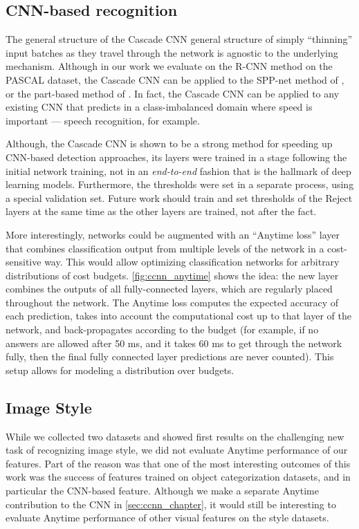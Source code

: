 \subsection{CNN-based recognition}

The general structure of the Cascade CNN general structure of simply ``thinning'' input batches as they travel through the network is agnostic to the underlying mechanism.
Although in our work we evaluate on the R-CNN method on the PASCAL dataset, the Cascade CNN can be applied to the SPP-net method of \cite{He-ECCV-2014}, or the part-based method of \cite{Zhang-ECCV-2014}.
In fact, the Cascade CNN can be applied to any existing CNN that predicts in a class-imbalanced domain where speed is important --- speech recognition, for example.

Although, the Cascade CNN is shown to be a strong method for speeding up CNN-based detection approaches, its layers were trained in a stage following the initial network training, not in an \emph{end-to-end} fashion that is the hallmark of deep learning models.
Furthermore, the thresholds were set in a separate process, using a special validation set.
Future work should train and set thresholds of the Reject layers at the same time as the other layers are trained, not after the fact.



More interestingly, networks could be augmented with an ``Anytime loss'' layer that combines classification output from multiple levels of the network in a cost-sensitive way.
This would allow optimizing classification networks for arbitrary distributions of cost budgets.
\autoref{fig:ccnn_anytime} shows the idea: the new layer combines the outputs of all fully-connected layers, which are regularly placed throughout the network.
The Anytime loss computes the expected accuracy of each prediction, takes into account the computational cost up to that layer of the network, and back-propagates according to the budget (for example, if no answers are allowed after 50 ms, and it takes 60 ms to get through the network fully, then the final fully connected layer predictions are never counted).
This setup allows for modeling a distribution over budgets.

\subsection{Image Style}
While we collected two datasets and showed first results on the challenging new task of recognizing image style, we did not evaluate Anytime performance of our features.
Part of the reason was that one of the most interesting outcomes of this work was the success of features trained on object categorization datasets, and in particular the CNN-based feature.
Although we make a separate Anytime contribution to the CNN in \autoref{sec:ccnn_chapter}, it would still be interesting to evaluate Anytime performance of other visual features on the style datasets.


